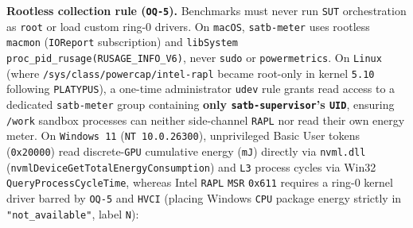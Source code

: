 \documentclass[10pt,letterpaper]{article}
\begin{document}
\textbf{Rootless collection rule (\texttt{OQ-5}).} Benchmarks must never
run \texttt{SUT} orchestration as \texttt{root} or load custom ring-0
drivers. On \texttt{macOS}, \texttt{satb-\allowbreak{}meter} uses rootless
\texttt{macmon} (\texttt{IOReport} subscription) and \texttt{libSystem}
\texttt{proc\_\allowbreak{}pid\_\allowbreak{}rusage(\allowbreak{}RUSAGE\_\allowbreak{}INFO\_\allowbreak{}V6)}, never \texttt{sudo} or
\texttt{powermetrics}. On \texttt{Linux} (where
\texttt{/\allowbreak{}sys/\allowbreak{}class/\allowbreak{}powercap/\allowbreak{}intel-\allowbreak{}rapl} became root-only in kernel
\texttt{5.10} following \texttt{PLATYPUS}), a one-time administrator
\texttt{udev} rule grants read access to a dedicated \texttt{satb-\allowbreak{}meter}
group containing \textbf{only \texttt{satb-\allowbreak{}supervisor}'s \texttt{UID}},
ensuring \texttt{/work} sandbox processes can neither side-channel
\texttt{RAPL} nor read their own energy meter. On \texttt{Windows\ 11}
(\texttt{NT\ 10.\allowbreak{}0.\allowbreak{}26300}), unprivileged Basic User tokens
(\texttt{0x20000}) read discrete-\texttt{GPU} cumulative energy
(\texttt{mJ}) directly via \texttt{nvml.dll}
(\texttt{nvmlDeviceGetTotalEnergyConsumption}) and \texttt{L3} process
cycles via Win32 \texttt{QueryProcessCycleTime}, whereas Intel
\texttt{RAPL} \texttt{MSR} \texttt{0x611} requires a ring-0 kernel
driver barred by \texttt{OQ-5} and \texttt{HVCI} (placing Windows
\texttt{CPU} package energy strictly in \texttt{"not\_\allowbreak{}available"}, label
\texttt{N}):
\end{document}
